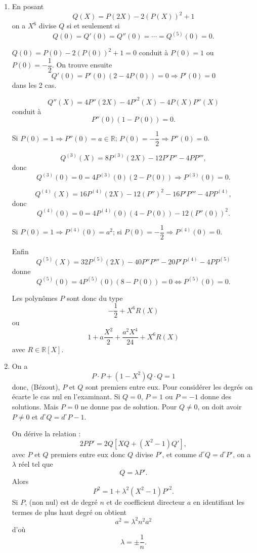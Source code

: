 \begin{enumerate}[label=\arabic*.,leftmargin=2.2em,itemsep=1.1em]
Si $K=\mathbb Z/2\mathbb Z$, les valeurs de la fonction polynôme associée à $P$ sont $P(0)$, $P(1)$ et le couple $(P(0),P(1))$ peut valoir $(0,0)$, $(0,1)$, $(1,0)$, $(1,1)$. Dans les 2 cas extrêmes, la fonction polynôme sera constante.

Or
\[
P(0)=P(1)=0\Longleftrightarrow P(X)=Q(X)X(X+1),
\]
(Théorème 7.38), et
\[
P(1)=P(0)=1\Longleftrightarrow P(X)=Q(X)X(X+1)+1,
\]
d'où les solutions du type
\[
P=X(X+1)Q+\lambda\qquad\text{avec }\lambda\in K=\mathbb Z/2\mathbb Z.
\]

\item En posant
\[
Q(X)=P(2X)-2(P(X))^2+1
\]
on a $X^6$ divise $Q$ si et seulement si
\[
Q(0)=Q'(0)=Q''(0)=\cdots=Q^{(5)}(0)=0.
\]

$Q(0)=P(0)-2(P(0))^2+1=0$ conduit à $P(0)=1$ ou $P(0)=-\dfrac12$. On trouve ensuite
\[
Q'(0)=P'(0)(2-4P(0))=0\Rightarrow P'(0)=0
\]
dans les 2 cas.

\[
Q''(X)=4P''(2X)-4P'^2(X)-4P(X)P''(X)
\]
conduit à
\[
P''(0)(1-P(0))=0.
\]

Si $P(0)=1\Rightarrow P''(0)=a\in\mathbb R$; $P(0)=-\dfrac12\Rightarrow P''(0)=0$.

\[
Q^{(3)}(X)=8P^{(3)}(2X)-12P'P''-4PP''',
\]
donc
\[
Q^{(3)}(0)=0=4P^{(3)}(0)(2-P(0))\Rightarrow P^{(3)}(0)=0.
\]

\[
Q^{(4)}(X)=16P^{(4)}(2X)-12(P'')^2-16P'P'''-4PP^{(4)},
\]
donc
\[
Q^{(4)}(0)=0=4P^{(4)}(0)(4-P(0))-12(P''(0))^2.
\]

Si $P(0)=1\Rightarrow P^{(4)}(0)=a^2$; si $P(0)=-\dfrac12\Rightarrow P^{(4)}(0)=0$.

Enfin
\[
Q^{(5)}(X)=32P^{(5)}(2X)-40P''P'''-20P'P^{(4)}-4PP^{(5)}
\]
donne
\[
Q^{(5)}(0)=4P^{(5)}(0)(8-P(0))=0\Longleftrightarrow P^{(5)}(0)=0.
\]

Les polynômes $P$ sont donc du type
\[
-\frac12+X^6R(X)
\]
ou
\[
1+a\frac{X^2}{2}+\frac{a^2X^4}{24}+X^6R(X)
\]
avec $R\in\mathbb R[X]$.

\item On a
\[
P\cdot P+(1-X^2)Q\cdot Q=1
\]
donc, (Bézout), $P$ et $Q$ sont premiers entre eux. Pour considérer les degrés on écarte le cas nul en l'examinant. Si $Q=0$, $P=1$ ou $P=-1$ donne des solutions. Mais $P=0$ ne donne pas de solution. Pour $Q\ne0$, on doit avoir $P\ne0$ et $d^\circ Q=d^\circ P-1$.

On dérive la relation :
\[
2PP'=2Q[XQ+(X^2-1)Q'],
\]
avec $P$ et $Q$ premiers entre eux donc $Q$ divise $P'$, et comme $d^\circ Q=d^\circ P'$, on a $\lambda$ réel tel que
\[
Q=\lambda P'.
\]
Alors
\[
P^2=1+\lambda^2(X^2-1)P'^2.
\]
Si $P$, (non nul) est de degré $n$ et de coefficient directeur $a$ en identifiant les termes de plus haut degré on obtient
\[
a^2=\lambda^2n^2a^2
\]
d'où
\[
\lambda=\pm\frac1n.
\]


\end{enumerate}

